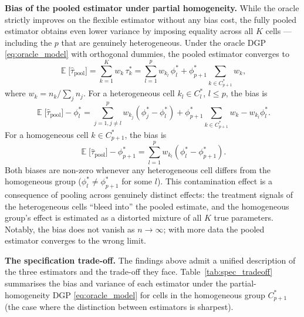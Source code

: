 \documentclass[margin=3in, 12pt]{article}
\DeclareMathOperator{\E}{\mathbb{E}}
\newcommand{\1}{\mathbbm{1}}
\begin{document}
\bigskip

\noindent\textbf{Bias of the pooled estimator under partial homogeneity.}
While the oracle strictly improves on the flexible estimator without
any bias cost, the fully pooled estimator obtains even lower variance by
imposing equality across all $K$ cells --- including the $p$ that are
genuinely heterogeneous.
Under the oracle DGP \eqref{eq:oracle_model} with orthogonal dummies, the
pooled estimator converges to
\begin{equation}
  \E\bigl[\hat\tau_{\text{pool}}\bigr]
  = \sum_{k=1}^K w_k\,\tau_k^*
  = \sum_{l=1}^p w_{k_l}\,\phi_l^*
    + \phi_{p+1}^*\!\!\!\sum_{k\in C_{p+1}^*} w_k,
  \label{eq:pool_plim}
\end{equation}
where $w_k = n_k/\sum_j n_j$.
For a heterogeneous cell $k_l \in C_l^*$, $l \leq p$, the bias is
\begin{equation}
  \E\bigl[\hat\tau_{\text{pool}}\bigr] - \phi_l^*
  = \sum_{j=1,j\neq l}^p w_{k_j}(\phi_j^* - \phi_l^*)
    + \phi_{p+1}^*\!\!\!\sum_{k\in C_{p+1}^*} w_k - w_{k_l}\phi_l^*.
  \label{eq:pool_bias_hetero}
\end{equation}
For a homogeneous cell $k \in C_{p+1}^*$, the bias is
\begin{equation}
  \E\bigl[\hat\tau_{\text{pool}}\bigr] - \phi_{p+1}^*
  = \sum_{l=1}^p w_{k_l}(\phi_l^* - \phi_{p+1}^*).
  \label{eq:pool_bias_homo}
\end{equation}
Both biases are non-zero whenever any heterogeneous cell differs from the
homogeneous group ($\phi_l^* \neq \phi_{p+1}^*$ for some $l$).
This contamination effect is a consequence of pooling across genuinely
distinct effects: the treatment signals of the heterogeneous cells
``bleed into'' the pooled estimate, and the homogeneous group's effect
is estimated as a distorted mixture of all $K$ true parameters.
Notably, the bias does not vanish as $n \to \infty$; with more data the
pooled estimator converges to the wrong limit.

\bigskip

\noindent\textbf{The specification trade-off.}
The findings above admit a unified description of the three estimators and
the trade-off they face.
Table~\ref{tab:spec_tradeoff} summarises the bias and variance of each
estimator under the partial-homogeneity DGP \eqref{eq:oracle_model}
for cells in the homogeneous group $C_{p+1}^*$ (the case where the
distinction between estimators is sharpest).
\end{document}
